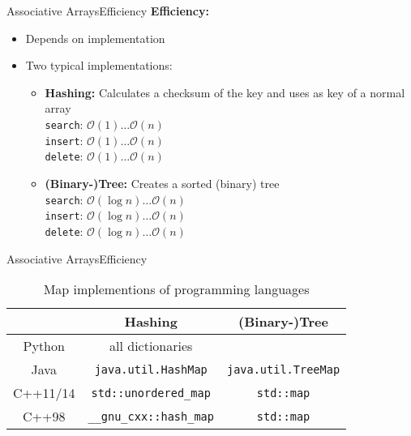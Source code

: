 

\begin{frame}{Associative Arrays}{Efficiency}
  \textbf{Efficiency:}
  \begin{itemize}
    \item
      Depends on implementation
    \item
      Two typical implementations:
      \begin{itemize}
        \item
          \textbf{Hashing:}
          Calculates a checksum of the key and uses as key of a normal array\\
          \texttt{search}: $\mathcal{O}(1) \dots \mathcal{O}(n)$\\
          \texttt{insert}: $\mathcal{O}(1) \dots \mathcal{O}(n)$\\
          \texttt{delete}: $\mathcal{O}(1) \dots \mathcal{O}(n)$
        \item
          \textbf{(Binary-)Tree:}
          Creates a sorted (binary) tree\\
          \texttt{search}: $\mathcal{O}(\log n) \dots \mathcal{O}(n)$\\
          \texttt{insert}: $\mathcal{O}(\log n) \dots \mathcal{O}(n)$\\
          \texttt{delete}: $\mathcal{O}(\log n) \dots \mathcal{O}(n)$
      \end{itemize}
  \end{itemize}
\end{frame}


\begin{frame}{Associative Arrays}{Efficiency}
  \begin{table}[!h]
    \caption{Map implementions of programming languages}
    \begin{tabular}{c|cc}
      {} & Hashing & (Binary-)Tree\\
      \midrule
      Python & all dictionaries & {}\\
      Java & \texttt{java.util.HashMap} & \texttt{java.util.TreeMap}\\
      C++11/14 & \texttt{std::unordered\_map} & \texttt{std::map}\\
      C++98 & \texttt{\_\_gnu\_cxx::hash\_map} & \texttt{std::map}
    \end{tabular}
  \end{table}
\end{frame}


